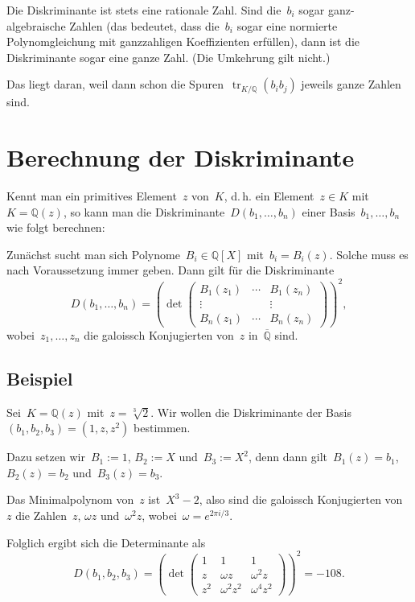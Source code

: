 \documentclass[12pt,a4paper,ngerman]{scrartcl}
\newcommand{\Q}{\mathbb{Q}}
\newcommand{\QQ}{\overline{\mathbb{Q}}}
\theoremstyle{definition}
\theoremstyle{plain}
\theoremstyle{remark}
\newcommand{\tr}[1]{\operatorname{tr}_{K/\Q}(#1)}
\begin{document}
Die Diskriminante ist stets eine rationale Zahl. Sind die~$b_i$ sogar
ganz-algebraische Zahlen (das bedeutet, dass die~$b_i$ sogar eine normierte
Polynomgleichung mit ganzzahligen Koeffizienten erfüllen), dann ist die
Diskriminante sogar eine ganze Zahl. (Die Umkehrung gilt nicht.)

Das liegt daran, weil dann schon die Spuren~$\tr{b_ib_j}$ jeweils ganze Zahlen
sind.


\section*{Berechnung der Diskriminante}

Kennt man ein primitives Element~$z$ von~$K$, d.\,h. ein Element~$z \in K$
mit~$K = \Q(z)$, so kann man die Diskriminante~$D(b_1,\ldots,b_n)$ einer
Basis~$b_1,\ldots,b_n$ wie folgt berechnen:

Zunächst sucht man sich Polynome~$B_i \in \Q[X]$ mit~$b_i = B_i(z)$. Solche
muss es nach Voraussetzung immer geben. Dann gilt für die Diskriminante
\[ D(b_1,\ldots,b_n) = \left(\operatorname{det} \begin{pmatrix}
  B_1(z_1) & \cdots & B_1(z_n) \\
  \vdots && \vdots \\
  B_n(z_1) & \cdots & B_n(z_n)
\end{pmatrix}\right)^2, \]
wobei~$z_1,\ldots,z_n$ die galoissch Konjugierten von~$z$ in~$\QQ$ sind.


\subsection*{Beispiel}

Sei~$K = \Q(z)$ mit~$z = \sqrt[3]{2}$. Wir wollen die Diskriminante der
Basis~$(b_1,b_2,b_3) = (1, z, z^2)$ bestimmen.

Dazu setzen wir~$B_1 := 1$, $B_2 := X$ und~$B_3 := X^2$, denn dann gilt~$B_1(z) =
b_1$, $B_2(z) = b_2$ und~$B_3(z) = b_3$.

Das Minimalpolynom von~$z$ ist~$X^3-2$, also sind die galoissch Konjugierten
von~$z$ die Zahlen~$z$, $\omega z$ und~$\omega^2 z$, wobei~$\omega = e^{2\pi
i/3}$.

Folglich ergibt sich die Determinante als
\[ D(b_1,b_2,b_3) = \left(\operatorname{det} \begin{pmatrix}
  1 & 1 & 1 \\
  z & \omega z & \omega^2 z \\
  z^2 & \omega^2 z^2 & \omega^4 z^2
\end{pmatrix}\right)^2 = -108. \]
\end{document}

